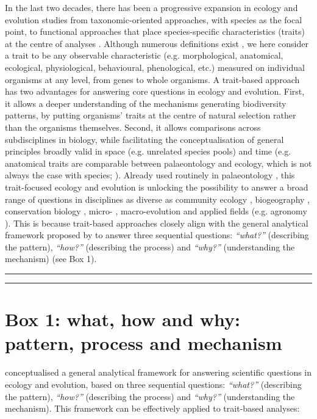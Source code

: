 \documentclass[12pt,letterpaper]{article}
\begin{document}
In the last two decades, there has been a progressive expansion in ecology and evolution studies from taxonomic-oriented approaches, with species as the focal point, to functional approaches that place species-specific characteristics (traits) at the centre of analyses \citep{violle2007let, mammola2021concepts, palacio2022protocol}.
Although numerous definitions exist \citep{dawson2021traits}, we here consider a trait to be any observable characteristic (e.g. morphological, anatomical, ecological, physiological, behavioural, phenological, etc.) measured on individual organisms at any level, from genes to whole organisms.
A trait-based approach has two advantages for answering core questions in ecology and evolution.
First, it allows a deeper understanding of the mechanisms generating biodiversity patterns, by putting organisms' traits at the centre of natural selection rather than the organisms themselves.
Second, it allows comparisons across subdisciplines in biology, while facilitating the conceptualisation of general principles broadly valid in space (e.g. unrelated species pools) and time (e.g. anatomical traits are comparable between palaeontology and ecology, which is not always the case with species; \citealt{luza2023going}).
Already used routinely in palaeontology \citep{raup1961geometry, gould1991disparity, foote1995morphological, guillerme2020disparities}, this trait-focused ecology and evolution is unlocking the possibility to answer a broad range of questions in disciplines as diverse as community ecology \citep{mcgill2006rebuilding}, biogeography \citep{violle2014emergence}, conservation biology \citep{chichorro2022trait}, micro- \citep{chapin1993evolution}, macro-evolution \citep{guillerme2023innovation} and applied fields (e.g. agronomy \citealt{martin2015plant}).
This is because trait-based approaches closely align with the general analytical framework proposed by \cite{anand1994pattern} to answer three sequential questions: \textit{``what?''} (describing the pattern), \textit{``how?''} (describing the process) and \textit{``why?''} (understanding the mechanism) (see Box 1).

\bigskip
\bigskip
\hrule
\hrule

\section*{Box 1: what, how and why: pattern, process and mechanism}
\cite{anand1994pattern} conceptualised a general analytical framework for answering scientific questions in ecology and evolution, based on three sequential questions: \textit{``what?''} (describing the pattern), \textit{``how?''} (describing the process) and \textit{``why?''} (understanding the mechanism).
This framework can be effectively applied to trait-based analyses:
\end{document}

